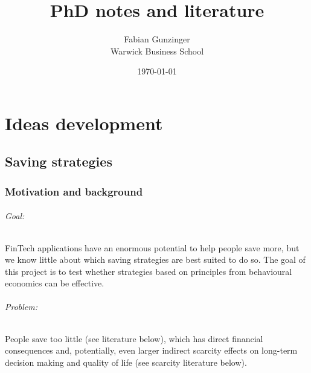 \documentclass[a4paper, 11pt]{report}
\title{\textbf{PhD notes and literature}}
\author{Fabian Gunzinger \\ Warwick Business School}
\date{\today}
\begin{document}
\maketitle
\tableofcontents
\newpage



						\part{Ideas development}


						\chapter{Saving strategies}

\section{Motivation and background}

\paragraph{Goal:}
FinTech applications have an enormous potential to help people save more, but we know little about which saving strategies are best suited to do so. The goal of this project is to test whether strategies based on principles from behavioural economics can be effective.

\paragraph{Problem:}
People save too little (see literature below), which has direct financial consequences and, potentially, even larger indirect scarcity effects on long-term decision making and quality of life (see scarcity literature below).
\end{document}
